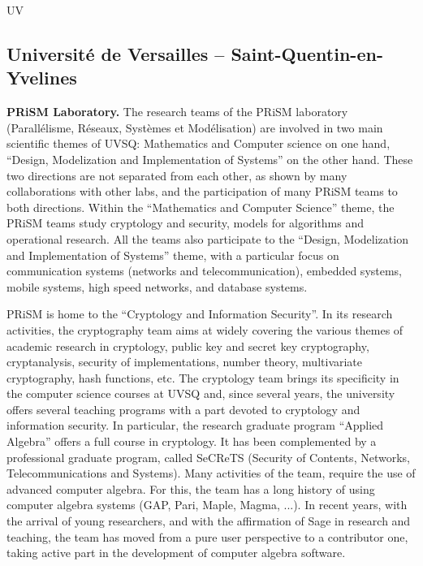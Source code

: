 \begin{sitedescription}{UV}

\subsection*{Université de Versailles -- Saint-Quentin-en-Yvelines}

{\bf PRiSM Laboratory.} The research teams of the PRiSM laboratory
(Parall\'elisme, Réseaux, Syst\`emes et Mod\'elisation) are involved
in two main scientific themes of UVSQ: Mathematics and Computer
science on one hand, ``Design, Modelization and Implementation of
Systems'' on the other hand. These two directions are not separated
from each other, as shown by many collaborations with other labs, and
the participation of many PRiSM teams to both directions. Within the
``Mathematics and Computer Science'' theme, the PRiSM teams study
cryptology and security, models for algorithms and operational
research. All the teams also participate to the ``Design, Modelization
and Implementation of Systems'' theme, with a particular focus on
communication systems (networks and telecommunication), embedded
systems, mobile systems, high speed networks, and database systems.

PRiSM is home to the ``Cryptology and Information Security''. In its
research activities, the cryptography team aims at widely covering the
various themes of academic research in cryptology, public key and
secret key cryptography, cryptanalysis, security of implementations,
number theory, multivariate cryptography, hash functions, etc. The
cryptology team brings its specificity in the computer science courses
at UVSQ and, since several years, the university offers several
teaching programs with a part devoted to cryptology and information
security. In particular, the research graduate program ``Applied
Algebra'' offers a full course in cryptology. It has been complemented
by a professional graduate program, called SeCReTS (Security of
Contents, Networks, Telecommunications and Systems). Many activities
of the team, require the use of advanced computer algebra. For this,
the team has a long history of using computer algebra systems (GAP,
Pari, Maple, Magma, ...). In recent years, with the arrival of young
researchers, and with the affirmation of Sage in research and
teaching, the team has moved from a pure user perspective to a
contributor one, taking active part in the development of computer
algebra software.



\end{sitedescription}
